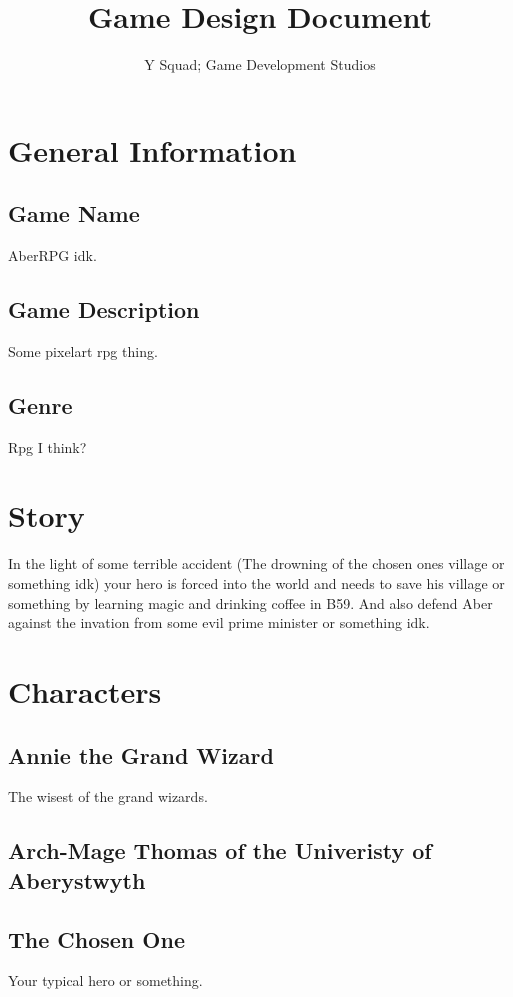 \documentclass{article}
\begin{document}
\title{Game Design Document}
\author{Y Squad; Game Development Studios}

\maketitle
\newpage

\section{General Information}
\subsection{Game Name}
AberRPG idk.

\subsection{Game Description}
Some pixelart rpg thing.

\subsection{Genre}
Rpg I think?

\section{Story}
In the light of some terrible accident (The drowning of the
chosen ones village or something idk) your hero is forced
into the world and needs to save his village or something
by learning magic and drinking coffee in B59. And also
defend Aber against the invation from some evil prime minister
or something idk.

\section{Characters}
\subsection{Annie the Grand Wizard}
The wisest of the grand wizards.

\subsection{Arch-Mage Thomas of the Univeristy of Aberystwyth}

\subsection{The Chosen One}
Your typical hero or something.
\end{document}
